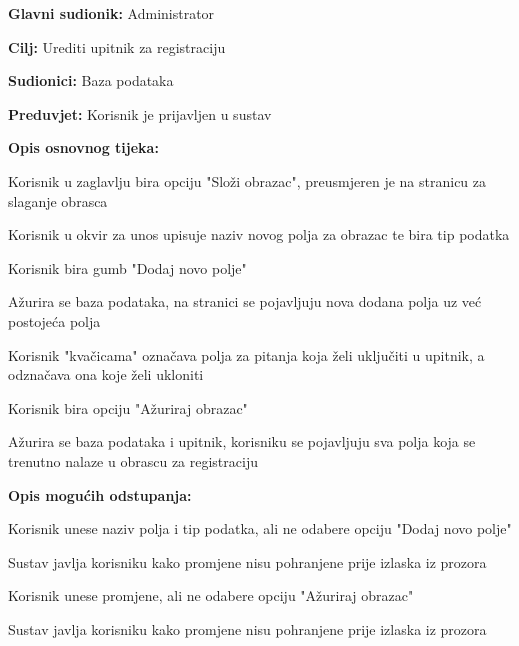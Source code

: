 					\noindent {}
					\begin{packed_item}
						\item \textbf{Glavni sudionik:} Administrator
						\item \textbf{Cilj:} Urediti upitnik za registraciju
						\item \textbf{Sudionici:} Baza podataka
						\item \textbf{Preduvjet:} Korisnik je prijavljen u sustav
						
						\item \textbf{Opis osnovnog tijeka:} 
						\item[] \begin{packed_enum}
							\item Korisnik u zaglavlju bira opciju "Složi obrazac", preusmjeren je na stranicu za slaganje obrasca
							\item Korisnik u okvir za unos upisuje naziv novog polja za obrazac te bira tip podatka
							\item Korisnik bira gumb "Dodaj novo polje"
							\item Ažurira se baza podataka, na stranici se pojavljuju nova dodana polja uz već postojeća polja
							\item Korisnik "kvačicama" označava polja za pitanja koja želi uključiti u upitnik, a odznačava ona koje želi ukloniti
							\item Korisnik bira opciju "Ažuriraj obrazac"
							\item Ažurira se baza podataka i upitnik, korisniku se pojavljuju sva polja koja se trenutno nalaze u obrascu za registraciju
						\end{packed_enum}
					
						\item \textbf{Opis mogućih odstupanja:}
						\item[] \begin{packed_enum}
							
							\item[3.a] Korisnik unese naziv polja i tip podatka, ali ne odabere opciju "Dodaj novo polje"
							\item[] \begin{packed_enum}
								\item[1.] Sustav javlja korisniku kako promjene nisu pohranjene prije izlaska iz prozora
							\end{packed_enum}

							\item[6.a] Korisnik unese promjene, ali ne odabere opciju "Ažuriraj obrazac"
							\item[] \begin{packed_enum}
								\item[1.] Sustav javlja korisniku kako promjene nisu pohranjene prije izlaska iz prozora
							\end{packed_enum}
							
						\end{packed_enum}                            
					\end{packed_item}



